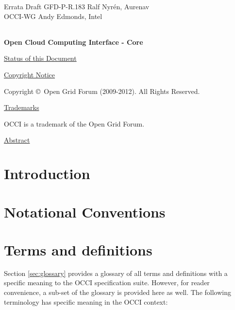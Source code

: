 \documentclass[10pt,a4paper]{article}
\begin{document}
\thispagestyle{empty}

Errata Draft GFD-P-R.183 \hfill  {Ralf Nyrén, Aurenav}\\
OCCI-WG \hfill  Andy Edmonds, Intel\\
\\

\vspace*{0.5in}

\begin{Large}
\textbf{Open Cloud Computing Interface - Core}
\end{Large}

\vspace*{0.5in}

\underline{Status of this Document}



\underline{Copyright Notice}

Copyright \copyright ~Open Grid Forum (2009-2012). All Rights Reserved.

\underline{Trademarks}

OCCI is a trademark of the Open Grid Forum.

\underline{Abstract}



\newpage
\tableofcontents
\newpage

\section{Introduction}


\section{Notational Conventions}


\section{Terms and definitions}
Section \ref{sec:glossary} provides a glossary of all terms and
definitions with a specific meaning to the OCCI specification
suite. However, for reader convenience, a sub-set of the glossary is
provided here as well. The following terminology has specific meaning
in the OCCI context:
\end{document}
